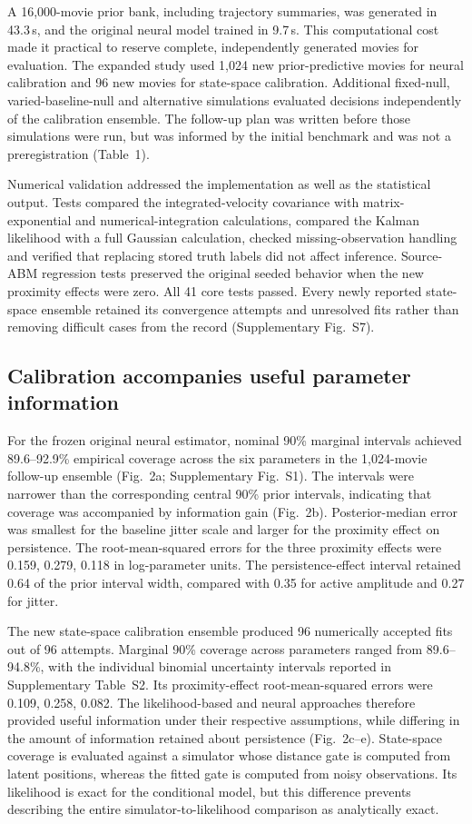 \documentclass[12pt]{article}
\begin{document}
A 16,000-movie prior bank, including trajectory summaries, was generated in 43.3\,s, and the original neural model trained in 9.7\,s. This computational cost made it practical to reserve complete, independently generated movies for evaluation. The expanded study used 1,024 new prior-predictive movies for neural calibration and 96 new movies for state-space calibration. Additional fixed-null, varied-baseline-null and alternative simulations evaluated decisions independently of the calibration ensemble. The follow-up plan was written before those simulations were run, but was informed by the initial benchmark and was not a preregistration (Table~1).

Numerical validation addressed the implementation as well as the statistical output. Tests compared the integrated-velocity covariance with matrix-exponential and numerical-integration calculations, compared the Kalman likelihood with a full Gaussian calculation, checked missing-observation handling and verified that replacing stored truth labels did not affect inference. Source-ABM regression tests preserved the original seeded behavior when the new proximity effects were zero. All 41 core tests passed. Every newly reported state-space ensemble retained its convergence attempts and unresolved fits rather than removing difficult cases from the record (Supplementary Fig.~S7).

\subsection*{Calibration accompanies useful parameter information}
For the frozen original neural estimator, nominal 90\% marginal intervals achieved 89.6--92.9\% empirical coverage across the six parameters in the 1,024-movie follow-up ensemble (Fig.~2a; Supplementary Fig.~S1). The intervals were narrower than the corresponding central 90\% prior intervals, indicating that coverage was accompanied by information gain (Fig.~2b). Posterior-median error was smallest for the baseline jitter scale and larger for the proximity effect on persistence. The root-mean-squared errors for the three proximity effects were 0.159, 0.279, 0.118 in log-parameter units. The persistence-effect interval retained 0.64 of the prior interval width, compared with 0.35 for active amplitude and 0.27 for jitter.

The new state-space calibration ensemble produced 96 numerically accepted fits out of 96 attempts. Marginal 90\% coverage across parameters ranged from 89.6--94.8\%, with the individual binomial uncertainty intervals reported in Supplementary Table~S2. Its proximity-effect root-mean-squared errors were 0.109, 0.258, 0.082. The likelihood-based and neural approaches therefore provided useful information under their respective assumptions, while differing in the amount of information retained about persistence (Fig.~2c--e). State-space coverage is evaluated against a simulator whose distance gate is computed from latent positions, whereas the fitted gate is computed from noisy observations. Its likelihood is exact for the conditional model, but this difference prevents describing the entire simulator-to-likelihood comparison as analytically exact.
\end{document}
